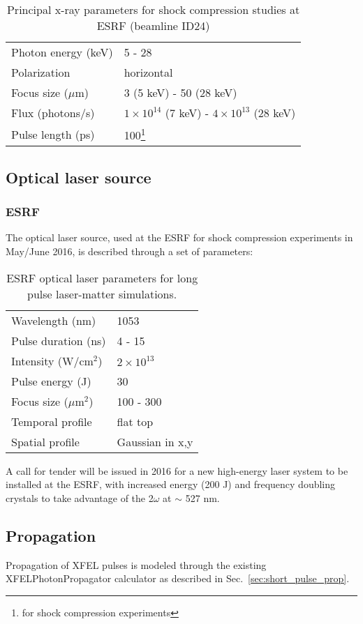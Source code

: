 \documentclass[a4paper]{article}
\begin{document}
\begin{table}
  \centering
  \begin{tabular}{ll}
    \hline
    Photon energy (keV) & 5 - 28 \\
    Polarization & horizontal \\
    Focus size ($\mu$m) & 3 (5 keV) - 50 (28 keV)\\
    Flux (photons/s) & $1\times 10^{14}$  (7 keV) - $4\times 10^{13}$ (28 keV) \\
    Pulse length (ps) & 100\footnote{for shock compression experiments}\\
    \hline
  \end{tabular}
  \caption{Principal x-ray parameters for shock compression studies at ESRF
  (beamline ID24)}
  \label{tab:esrf_parameters}
\end{table}

\subsection{Optical laser source}
\subsubsection{ESRF}
The optical laser source, used at the ESRF for shock compression experiments in May/June 2016,  is described through a set of parameters:
\begin{table}
  \centering
  \begin{tabular}{ll}
    \hline
Wavelength (nm) & 1053 \\
Pulse duration (ns) & 4 - 15 \\
Intensity (W/cm$^2$) & $2\times 10^{13}$\\
Pulse energy (J) & 30 \\
Focus size ($\mu\text{m}^{2}$) & 100 - 300  \\
Temporal profile  & flat top \\
Spatial profile & Gaussian in x,y \\
    \hline
  \end{tabular}
  \caption{ESRF optical laser parameters for long pulse laser-matter
  simulations.}
  \label{tab:esrf_long_pulse}
\end{table}

A call for tender will be issued in 2016 for a new high-energy laser system to be installed at the ESRF, with increased energy (200 J) and frequency doubling crystals to take advantage of the 2$\omega$ at $\sim$ 527 nm.
\subsection{Propagation}
Propagation of XFEL pulses is modeled through the existing XFELPhotonPropagator calculator as described in Sec.~\ref{sec:short_pulse_prop}.
\end{document}
